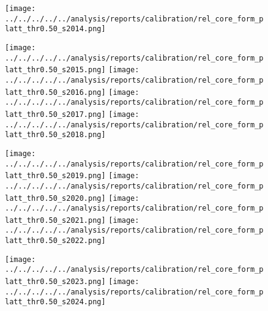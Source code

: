 \begin{figure}[t]
\begin{minipage}[t]{0.49\linewidth}
    \texttt{[image: ../../../../../analysis/reports/calibration/rel\_core\_form\_platt\_thr0.50\_s2014.png]}
    \par\vspace{2pt}
    \texttt{[image: ../../../../../analysis/reports/calibration/rel\_core\_form\_platt\_thr0.50\_s2015.png]}
    \texttt{[image: ../../../../../analysis/reports/calibration/rel\_core\_form\_platt\_thr0.50\_s2016.png]}
    \texttt{[image: ../../../../../analysis/reports/calibration/rel\_core\_form\_platt\_thr0.50\_s2017.png]}
    \texttt{[image: ../../../../../analysis/reports/calibration/rel\_core\_form\_platt\_thr0.50\_s2018.png]}
    \par\vspace{2pt}
    \texttt{[image: ../../../../../analysis/reports/calibration/rel\_core\_form\_platt\_thr0.50\_s2019.png]}
    \texttt{[image: ../../../../../analysis/reports/calibration/rel\_core\_form\_platt\_thr0.50\_s2020.png]}
    \texttt{[image: ../../../../../analysis/reports/calibration/rel\_core\_form\_platt\_thr0.50\_s2021.png]}
    \texttt{[image: ../../../../../analysis/reports/calibration/rel\_core\_form\_platt\_thr0.50\_s2022.png]}
    \par\vspace{2pt}
    \texttt{[image: ../../../../../analysis/reports/calibration/rel\_core\_form\_platt\_thr0.50\_s2023.png]}
    \texttt{[image: ../../../../../analysis/reports/calibration/rel\_core\_form\_platt\_thr0.50\_s2024.png]}
  \end{minipage}
\end{figure}
